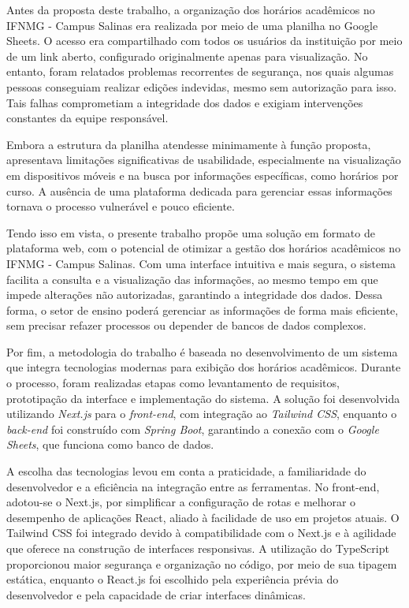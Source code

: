 Antes da proposta deste trabalho, a organização dos horários acadêmicos no IFNMG - Campus Salinas era realizada por meio de uma planilha no Google Sheets. O acesso era compartilhado com todos os usuários da instituição por meio de um link aberto, configurado originalmente apenas para visualização. No entanto, foram relatados problemas recorrentes de segurança, nos quais algumas pessoas conseguiam realizar edições indevidas, mesmo sem autorização para isso. Tais falhas comprometiam a integridade dos dados e exigiam intervenções constantes da equipe responsável.

Embora a estrutura da planilha atendesse minimamente à função proposta, apresentava limitações significativas de usabilidade, especialmente na visualização em dispositivos móveis e na busca por informações específicas, como horários por curso. A ausência de uma plataforma dedicada para gerenciar essas informações tornava o processo vulnerável e pouco eficiente.

Tendo isso em vista, o presente trabalho propõe uma solução em formato de plataforma web, com o potencial de otimizar a gestão dos horários acadêmicos no IFNMG - Campus Salinas. Com uma interface intuitiva e mais segura, o sistema facilita a consulta e a visualização das informações, ao mesmo tempo em que impede alterações não autorizadas, garantindo a integridade dos dados. Dessa forma, o setor de ensino poderá gerenciar as informações de forma mais eficiente, sem precisar refazer processos ou depender de bancos de dados complexos.

Por fim, a metodologia do trabalho é baseada no desenvolvimento de um sistema que integra tecnologias modernas para exibição dos horários acadêmicos. Durante o processo, foram realizadas etapas como levantamento de requisitos, prototipação da interface e implementação do sistema. A solução foi desenvolvida utilizando \textit{Next.js} para o \textit{front-end}, com integração ao \textit{Tailwind CSS}, enquanto o \textit{back-end} foi construído com \textit{Spring Boot}, garantindo a conexão com o \textit{Google Sheets}, que funciona como banco de dados. 

A escolha das tecnologias levou em conta a praticidade, a familiaridade do desenvolvedor e a eficiência na integração entre as ferramentas. No front-end, adotou-se o Next.js, por simplificar a configuração de rotas e melhorar o desempenho de aplicações React, aliado à facilidade de uso em projetos atuais. O Tailwind CSS foi integrado devido à compatibilidade com o Next.js e à agilidade que oferece na construção de interfaces responsivas. A utilização do TypeScript proporcionou maior segurança e organização no código, por meio de sua tipagem estática, enquanto o React.js foi escolhido pela experiência prévia do desenvolvedor e pela capacidade de criar interfaces dinâmicas.

